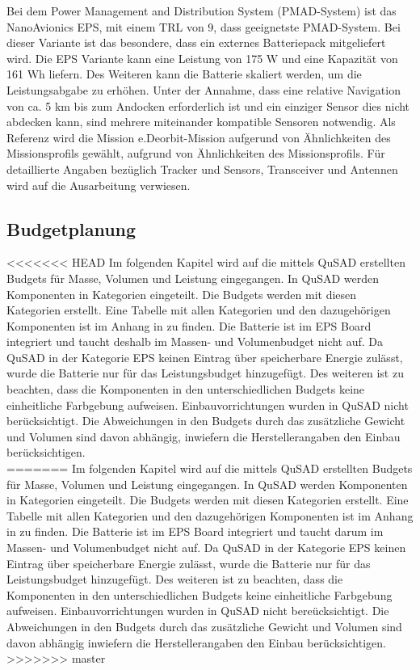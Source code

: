 	Bei dem Power Management and Distribution System (PMAD-System) ist das NanoAvionics EPS, mit einem TRL von 9, dass geeignetste PMAD-System. Bei dieser Variante ist das besondere, dass ein externes Batteriepack mitgeliefert wird. Die EPS Variante kann eine Leistung von 175 W und eine Kapazität von 161 Wh liefern. Des Weiteren kann die Batterie skaliert werden, um die Leistungsabgabe zu erhöhen. Unter der Annahme, dass eine relative Navigation von ca. 5 km bis zum Andocken erforderlich ist und ein einziger Sensor dies nicht abdecken kann, sind mehrere miteinander kompatible Sensoren notwendig. Als Referenz wird die Mission e.Deorbit-Mission aufgerund von Ähnlichkeiten des Missionsprofils gewählt, aufgrund von Ähnlichkeiten des Missionsprofils. Für detaillierte Angaben bezüglich Tracker und Sensors, Transceiver und Antennen wird auf die Ausarbeitung \cite{Lettau.} verwiesen.

				\subsection{Budgetplanung}
<<<<<<< HEAD
Im folgenden Kapitel wird auf die mittels QuSAD erstellten Budgets für Masse, Volumen und Leistung eingegangen. In QuSAD werden Komponenten in Kategorien eingeteilt. Die Budgets werden mit diesen Kategorien erstellt. Eine Tabelle mit allen Kategorien und den dazugehörigen Komponenten ist im Anhang in \tab{} zu finden. Die Batterie ist im EPS Board integriert und taucht deshalb im Massen- und Volumenbudget nicht auf. Da QuSAD in der Kategorie EPS keinen Eintrag über speicherbare Energie zulässt, wurde die Batterie nur für das Leistungsbudget hinzugefügt. Des weiteren ist zu beachten, dass die Komponenten in den unterschiedlichen Budgets keine einheitliche Farbgebung aufweisen. Einbauvorrichtungen wurden in QuSAD nicht berücksichtigt. Die Abweichungen in den Budgets durch das  zusätzliche Gewicht und Volumen sind davon abhängig, inwiefern die Herstellerangaben den Einbau berücksichtigen.\\
=======
Im folgenden Kapitel wird auf die mittels QuSAD erstellten Budgets für Masse, Volumen und Leistung eingegangen. In QuSAD werden Komponenten in Kategorien eingeteilt. Die Budgets werden mit diesen Kategorien erstellt. Eine Tabelle mit allen Kategorien und den dazugehörigen Komponenten ist im Anhang in  zu finden. Die Batterie ist im EPS Board integriert und taucht darum im Massen- und Volumenbudget nicht auf. Da QuSAD in der Kategorie EPS keinen Eintrag über speicherbare Energie zulässt, wurde die Batterie nur für das Leistungsbudget hinzugefügt. Des weiteren ist zu beachten, dass die Komponenten in den unterschiedlichen Budgets keine einheitliche Farbgebung aufweisen. Einbauvorrichtungen wurden in QuSAD nicht bereücksichtigt. Die Abweichungen in den Budgets durch das  zusätzliche Gewicht und Volumen sind davon abhängig inwiefern die Herstellerangaben den Einbau berücksichtigen.\\
>>>>>>> master
\newpage
